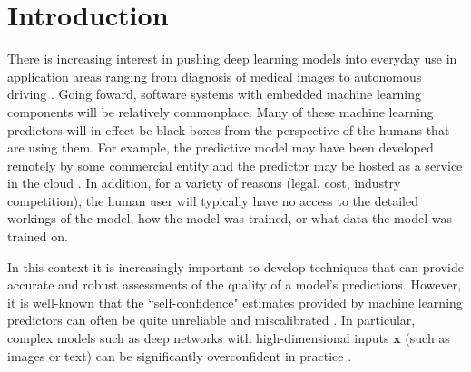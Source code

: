 \documentclass{article}
\newcommand{\ux}{{\mathbf{x}}}
\newcommand{\robby}[1]{\textcolor{Red}{[#1]\textsubscript{Robby}}}
\begin{document}
\section{Introduction}

 
There is increasing interest in pushing deep learning models into everyday use in application areas ranging from   diagnosis of medical images \cite{kermany2018identifying} to autonomous driving \cite{du2017fused}. Going foward, software systems with embedded machine learning components will be relatively commonplace.  
Many of these machine learning predictors will in effect be black-boxes from the perspective of  the humans that are using them. For example, the predictive model may have been developed remotely by some commercial entity  and the predictor may be hosted as a  service in the cloud  \cite{sanyal2018tapas}.
In addition, for a variety of reasons (legal, cost, industry competition), the human user will typically have no access to the detailed workings of the model, how the model was trained, or what data the model was trained on.  

In this context it is increasingly important to develop techniques that can provide accurate and robust assessments of the quality of a model's predictions.
However, it is well-known that the ``self-confidence" estimates provided by machine learning predictors can often be quite unreliable and miscalibrated \cite{zadrozny2002transforming,kull2017a}.
In particular, complex models such as deep networks with high-dimensional inputs $\ux$ (such as images or text) can be significantly overconfident in practice \cite{gal2016dropout, guo2017calibration,lakshminarayanan2017simple,kuleshov2018accurate, keren2018calibrated}.  
\end{document}
